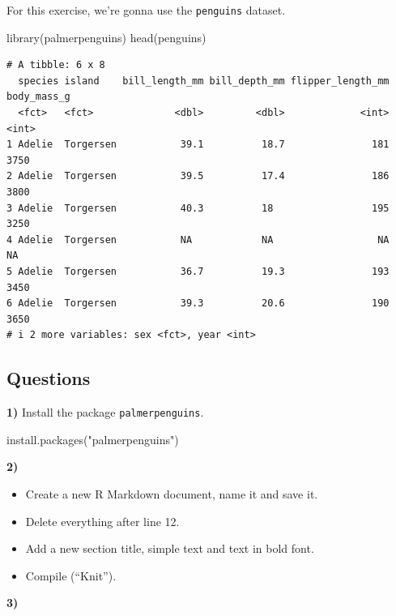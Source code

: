 \documentclass[
  letterpaper,
  DIV=11,
  numbers=noendperiod]{scrreprt}
\newenvironment{Shaded}{\begin{snugshade}}{\end{snugshade}}
\newcommand{\FunctionTok}[1]{\textcolor[rgb]{0.28,0.35,0.67}{#1}}
\newcommand{\NormalTok}[1]{\textcolor[rgb]{0.00,0.23,0.31}{#1}}
\newcommand{\StringTok}[1]{\textcolor[rgb]{0.13,0.47,0.30}{#1}}
\providecommand{\tightlist}{%
  \setlength{\itemsep}{0pt}\setlength{\parskip}{0pt}}\usepackage{longtable,booktabs,array}
\begin{document}
For this exercise, we're gonna use the \texttt{penguins} dataset.

\begin{Shaded}
\begin{Highlighting}[]
\FunctionTok{library}\NormalTok{(palmerpenguins)}
\FunctionTok{head}\NormalTok{(penguins)}
\end{Highlighting}
\end{Shaded}

\begin{verbatim}
# A tibble: 6 x 8
  species island    bill_length_mm bill_depth_mm flipper_length_mm body_mass_g
  <fct>   <fct>              <dbl>         <dbl>             <int>       <int>
1 Adelie  Torgersen           39.1          18.7               181        3750
2 Adelie  Torgersen           39.5          17.4               186        3800
3 Adelie  Torgersen           40.3          18                 195        3250
4 Adelie  Torgersen           NA            NA                  NA          NA
5 Adelie  Torgersen           36.7          19.3               193        3450
6 Adelie  Torgersen           39.3          20.6               190        3650
# i 2 more variables: sex <fct>, year <int>
\end{verbatim}

\subsection{Questions}\label{questions}

\textbf{1)} Install the package \texttt{palmerpenguins}.

\begin{Shaded}
\begin{Highlighting}[]
\FunctionTok{install.packages}\NormalTok{(}\StringTok{"palmerpenguins"}\NormalTok{)}
\end{Highlighting}
\end{Shaded}

\textbf{2)}

\begin{itemize}
\tightlist
\item
  Create a new R Markdown document, name it and save it.
\item
  Delete everything after line 12.
\item
  Add a new section title, simple text and text in bold font.
\item
  Compile (``Knit'').
\end{itemize}

\textbf{3)}
\end{document}
